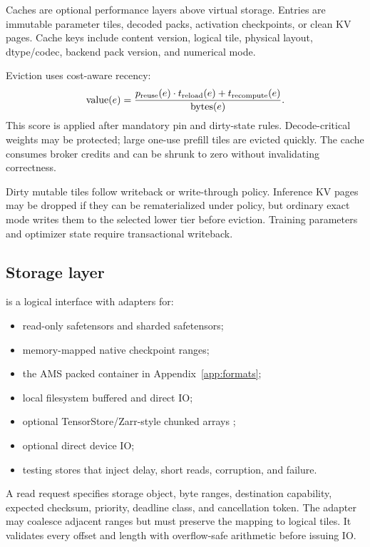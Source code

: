 Caches are optional performance layers above virtual storage. Entries are immutable parameter tiles, decoded packs, activation checkpoints, or clean KV pages. Cache keys include content version, logical tile, physical layout, dtype/codec, backend pack version, and numerical mode.

Eviction uses cost-aware recency:
\[
  \operatorname{value}(e)
  =\frac{p_{\mathrm{reuse}}(e)\cdot t_{\mathrm{reload}}(e)
  +t_{\mathrm{recompute}}(e)}{\operatorname{bytes}(e)}.
\]
This score is applied after mandatory pin and dirty-state rules. Decode-critical weights may be protected; large one-use prefill tiles are evicted quickly. The cache consumes broker credits and can be shrunk to zero without invalidating correctness.

Dirty mutable tiles follow writeback or write-through policy. Inference KV pages may be dropped if they can be rematerialized under policy, but ordinary exact mode writes them to the selected lower tier before eviction. Training parameters and optimizer state require transactional writeback.

\subsection{Storage layer}

 is a logical interface with adapters for:

\begin{itemize}
  \item read-only safetensors and sharded safetensors;
  \item memory-mapped native checkpoint ranges;
  \item the AMS packed container in Appendix~\ref{app:formats};
  \item local filesystem buffered and direct IO;
  \item optional TensorStore/Zarr-style chunked arrays \cite{tensorstore};
  \item optional direct device IO;
  \item testing stores that inject delay, short reads, corruption, and failure.
\end{itemize}

A read request specifies storage object, byte ranges, destination capability, expected checksum, priority, deadline class, and cancellation token. The adapter may coalesce adjacent ranges but must preserve the mapping to logical tiles. It validates every offset and length with overflow-safe arithmetic before issuing IO.

